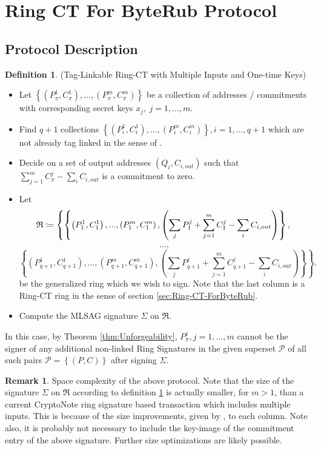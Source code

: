 \documentclass[12pt,english]{mrl}
\theoremstyle{definition}
\newtheorem{Defn}[lem]{Definition}
\newtheorem{rem}[lem]{Remark}
\newenvironment{defn}{\begin{Defn}\rm}{\end{Defn}}
\numberwithin{equation}{section}
\numberwithin{figure}{section}
\numberwithin{equation}{section}
\numberwithin{equation}{section}
\numberwithin{figure}{section}
\begin{document}
\section{\label{sec:Ring-CT-ForByteRub}Ring CT For ByteRub Protocol}


\subsection{Protocol Description}
\begin{defn}
\label{RCTProtocol}(Tag-Linkable Ring-CT with
Multiple Inputs and One-time Keys) \end{defn}
\begin{itemize}
\item Let $\left\{ \left(P_{\pi}^{1},C_{\pi}^{1}\right),...,\left(P_{\pi}^{m},C_{\pi}^{m}\right)\right\} $
be a collection of addresses / commitments with corresponding secret
keys $x_{j},\ j=1,...,m$. 
\item Find $q+1$ collections $\left\{ \left(P_{i}^{1},C_{i}^{1}\right),...,\left(P_{i}^{m},C_{i}^{m}\right)\right\} ,i=1,...,q+1$
which are not already tag linked in the sense of \cite[page 6]{FS}. 
\item Decide on a set of output addresses $\left(Q_{i},C_{i,out}\right)$
such that $\sum_{j=1}^{m}C_{\pi}^{j}-\sum_{i}C_{i,out}$ is a commitment
to zero. 
\item Let 
\[
\mbox{\ensuremath{\mathfrak{R}}}\coloneqq\left\{ \left\{ \left(P_{1}^{1},C_{1}^{1}\right),...,\left(P_{1}^{m},C_{1}^{m}\right),\left(\sum_{j}P_{1}^{j}+\sum_{j=1}^{m}C_{1}^{j}-\sum_{i}C_{i,out}\right)\right\} ,\right.
\]
\[
...,
\]
\[
\left.\left\{ \left(P_{q+1}^{1},C_{q+1}^{1}\right),...,\left(P_{q+1}^{m},C_{q+1}^{m}\right),\left(\sum_{j}P_{q+1}^{j}+\sum_{j=1}^{m}C_{q+1}^{j}-\sum_{i}C_{i,out}\right)\right\} \right\} .
\]
 be the generalized ring which we wish to sign. Note that the last
column is a Ring-CT ring in the sense of section \ref{sec:Ring-CT-ForByteRub}. 
\item Compute the MLSAG signature $\Sigma$ on $\mathfrak{R}.$
\end{itemize}
In this case, by Theorem \ref{thm:Unforgeability}, $P_{\pi}^{j},j=1,...,m$ cannot be the signer of any
additional non-linked Ring Signatures in the given superset $\mathcal{P}$
of all such pairs $\mathcal{P}=\left\{ \left(P,C\right)\right\} $
after signing $\Sigma$. 
\begin{rem}
Space complexity of the above protocol. Note that the size of the
signature $\Sigma$ on $\mathfrak{R}$ according to definition \ref{RCTProtocol}
is actually smaller, for $m>1$, than a current CryptoNote \cite{CN}
ring signature based transaction which includes multiple inputs. This
is because of the size improvements, given by \cite{LWW}, to each
column. Note also, it is probably not necessary to include the key-image
of the commitment entry of the above signature. Further size optimizations
are likely possible.\end{rem}
\end{document}
